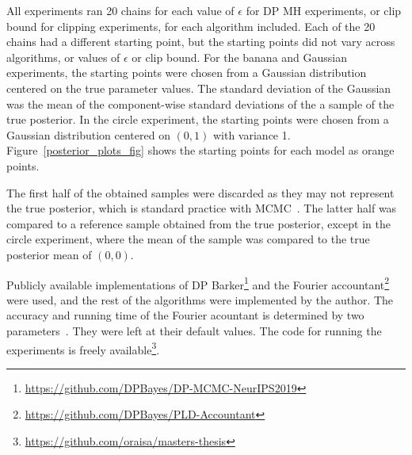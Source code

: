 \documentclass[english,twoside,openright]{HYgraduMLDS}
\begin{document}
All experiments ran 20 chains for each value
of \(\epsilon\) for DP MH experiments, or clip bound for clipping experiments,
for each algorithm included. Each of the
20 chains had a different starting point,
but the starting points did
not vary across algorithms, or values of \(\epsilon\) or clip bound.
For the banana and Gaussian experiments, the starting points were chosen
from a Gaussian distribution centered on the true parameter values. The standard
deviation of the Gaussian was the mean of the component-wise standard deviations
of the a sample of the true posterior. In the circle experiment, the starting points
were chosen from a Gaussian distribution centered on \((0, 1)\) with
variance 1. Figure~\ref{posterior_plots_fig} shows the starting points for
each model as orange points.

The first half of the obtained samples were discarded as they may not represent
the true posterior, which is standard practice with MCMC~\cite{BDA}. The
latter half was compared to a reference sample obtained from the true posterior,
except in the circle experiment, where the mean of the sample was compared to
the true posterior mean of \((0,0)\).

Publicly available implementations of DP
Barker\footnote{\url{https://github.com/DPBayes/DP-MCMC-NeurIPS2019}}
and the Fourier
accountant\footnote{\url{https://github.com/DPBayes/PLD-Accountant}} were
used, and the rest of the algorithms were implemented by the author.
The accuracy and running time of the Fourier acountant is
determined by two parameters~\cite{KJH20}. They were left at their default values.
The code for running the experiments is freely
available\footnote{\url{https://github.com/oraisa/masters-thesis}}.
\end{document}
